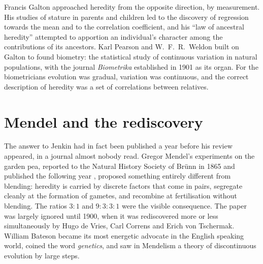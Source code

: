 Francis Galton approached heredity from the opposite direction, by measurement. His studies of
stature in parents and children led to the discovery of regression towards the mean
\citep{intro:galton1886} and to the correlation coefficient, and his ``law of ancestral heredity''
attempted to apportion an individual's character among the contributions of its ancestors. Karl
Pearson and W.~F.~R.\ Weldon built on Galton to found biometry: the statistical study of continuous
variation in natural populations, with the journal \emph{Biometrika} established in 1901 as its
organ. For the biometricians evolution was gradual, variation was continuous, and the correct
description of heredity was a set of correlations between relatives.

\section{Mendel and the rediscovery}

The answer to Jenkin had in fact been published a year before his review appeared, in a journal
almost nobody read. Gregor Mendel's experiments on the garden pea, reported to the Natural
History Society of Br\"unn in 1865 and published the following year \citep{intro:mendel1866},
proposed something entirely different from blending: heredity is carried by discrete factors that
come in pairs, segregate cleanly at the formation of gametes, and recombine at fertilisation
without blending. The ratios $3:1$ and $9:3:3:1$ were the visible consequence. The paper was largely
ignored until 1900, when it was rediscovered more or less simultaneously by Hugo de Vries, Carl
Correns and Erich von Tschermak. William Bateson became its most energetic advocate in the English
speaking world, coined the word \emph{genetics}, and saw in Mendelism a theory of discontinuous
evolution by large steps.


